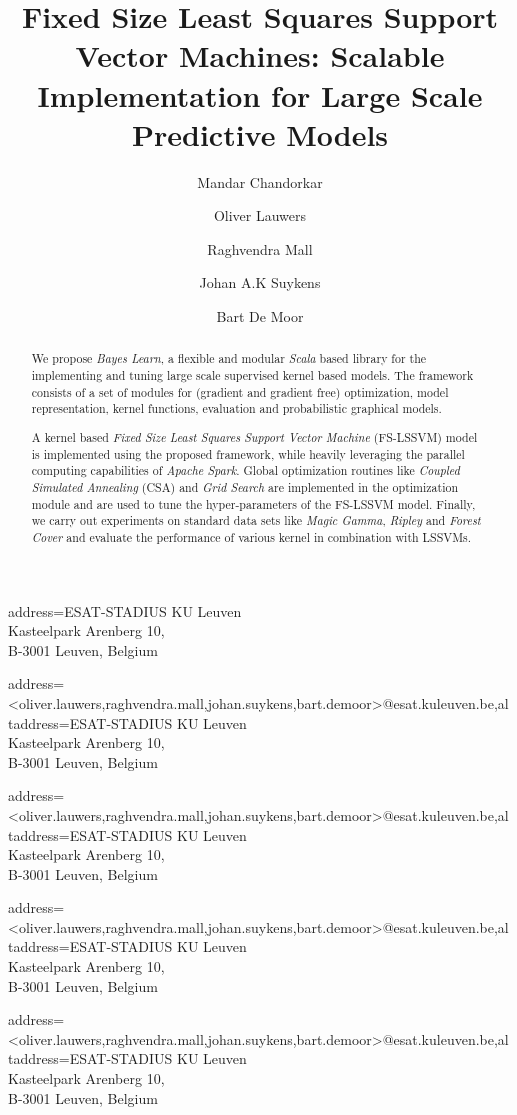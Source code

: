 \documentclass[
    ,final            %
  ]
  {aipproc}
\begin{document}
\title{Fixed Size Least Squares Support Vector Machines: Scalable Implementation for Large Scale Predictive Models}


\author{Mandar Chandorkar}{
  address={ESAT-STADIUS KU Leuven \\ Kasteelpark Arenberg 10, \\ B-3001 Leuven, Belgium}
}

\author{Oliver Lauwers}{
  address={<oliver.lauwers,raghvendra.mall,johan.suykens,bart.demoor>@esat.kuleuven.be},altaddress={ESAT-STADIUS KU Leuven \\ Kasteelpark Arenberg 10, \\ B-3001 Leuven, Belgium}}

\author{Raghvendra Mall}{
  address={<oliver.lauwers,raghvendra.mall,johan.suykens,bart.demoor>@esat.kuleuven.be},altaddress={ESAT-STADIUS KU Leuven \\ Kasteelpark Arenberg 10, \\ B-3001 Leuven, Belgium}}%


\author{Johan A.K Suykens}{
  address={<oliver.lauwers,raghvendra.mall,johan.suykens,bart.demoor>@esat.kuleuven.be},altaddress={ESAT-STADIUS KU Leuven \\ Kasteelpark Arenberg 10, \\ B-3001 Leuven, Belgium} %
}

\author{Bart De Moor}{
  address={<oliver.lauwers,raghvendra.mall,johan.suykens,bart.demoor>@esat.kuleuven.be},altaddress={ESAT-STADIUS KU Leuven \\ Kasteelpark Arenberg 10, \\ B-3001 Leuven, Belgium} %
}



\begin{abstract}
 We propose \textit{Bayes Learn}, a flexible and modular \textit{Scala} based library for the implementing and tuning large scale supervised kernel based models. The framework consists of a set of modules for (gradient and gradient free) optimization, model representation, kernel functions, evaluation and probabilistic graphical models.
 
 A kernel based \emph{Fixed Size Least Squares Support Vector Machine} (FS-LSSVM) model is implemented using the proposed framework, while heavily leveraging the parallel computing capabilities of \textit{Apache Spark}. Global optimization routines like \emph{Coupled Simulated Annealing} (CSA) and \emph{Grid Search} are implemented in the optimization module and are used to tune the hyper-parameters of the FS-LSSVM model. Finally, we carry out experiments on standard data sets like \emph{Magic Gamma}, \emph{Ripley} and \emph{Forest Cover} and evaluate the performance of various kernel in combination with LSSVMs.     
\end{abstract}
\end{document}

